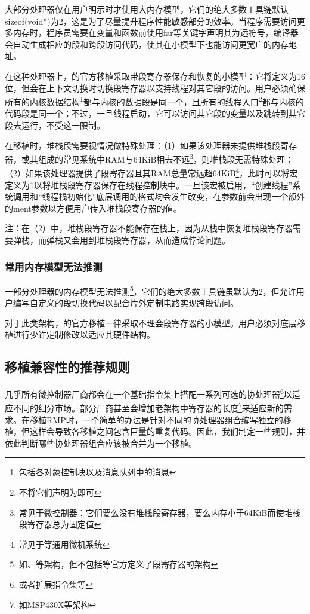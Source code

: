 \protect{}\label{subsubsec:the-common-memory-model-is-the-small-model-2}大部分处理器仅在用户明示时才使用大内存模型，它们的绝大多数工具链默认sizeof(void*)为2，这是为了尽量提升程序性能敏感部分的效率。当程序需要访问更多内存时，程序员需要在变量和函数前使用far等关键字声明其为远符号，编译器会自动生成相应的段和跨段访问代码，使其在小模型下也能访问更宽广的内存地址。

在这种处理器上，的官方移植采取带段寄存器保存和恢复的小模型：它将定义为16位，但会在上下文切换时切换段寄存器以支持线程对其它段的访问。用户必须确保所有的内核数据结构\footnote{包括各对象控制块以及消息队列中的消息}都与内核的数据段是同一个，且所有的线程入口\footnote{不将它们声明为即可}都与内核的代码段是同一个；不过，一旦线程启动，它可以访问其它段的变量以及跳转到其它段去运行，不受这一限制。

在移植时，堆栈段需要视情况做特殊处理：（1）如果该处理器未提供堆栈段寄存器，或其组成的常见系统中RAM与64KiB相去不远\footnote{常见于微控制器：它们要么没有堆栈段寄存器，要么内存小于64KiB而使堆栈段寄存器总为固定值}，则堆栈段无需特殊处理；（2）如果该处理器提供了段寄存器且其RAM总量常远超64KiB\footnote{常见于等通用微机系统}，此时可以将宏定义为1以将堆栈段寄存器保存在线程控制块中。一旦该宏被启用，``创建线程''系统调用和``线程栈初始化''底层调用的格式均会发生改变，在参数前会出现一个额外的ment参数以方便用户传入堆栈段寄存器的值。

注：在（2）中，堆栈段寄存器不能保存在栈上，因为从栈中恢复堆栈段寄存器需要弹栈，而弹栈又会用到堆栈段寄存器，从而造成悖论问题。

\subsubsection{常用内存模型无法推测}\label{subsubsec:the-common-memory-model-cannot-be-inferred}

一部分处理器的内存模型无法推测\footnote{如、等架构，但不包括等官方定义了段寄存器的架构}，它们的绝大多数工具链虽默认为2，但允许用户编写自定义的段切换代码以配合片外定制电路实现跨段访问。

对于此类架构，的官方移植一律采取不理会段寄存器的小模型。用户必须对底层移植进行少许定制修改以适应其硬件结构。

\subsection{移植兼容性的推荐规则}\label{subsec:recommended-rules-for-porting-compatibility}

几乎所有微控制器厂商都会在一个基础指令集上搭配一系列可选的协处理器\footnote{或者扩展指令集等}以适应不同的细分市场。部分厂商甚至会增加老架构中寄存器的长度\footnote{如MSP430X等架构}来适应新的需求。在移植RMP时，一个简单的办法是针对不同的协处理器组合编写独立的移植，但这样会导致各移植之间包含巨量的重复代码。因此，我们制定一些规则，并依此判断哪些协处理器组合应该被合并为一个移植。

